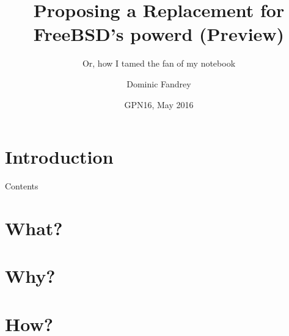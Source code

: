 \documentclass{beamer}
\title{Proposing a Replacement for FreeBSD's powerd (Preview)}
\subtitle{Or, how I tamed the fan of my notebook}
\author[D. Fandrey]{Dominic Fandrey}
\institute[VLI]{Von Leitner-Institut für verteiltes Echtzeit-Java}
\date[GPN 2016]{GPN16, May 2016}
\begin{document}
\section{Introduction}

\begin{frame}[plain]
\titlepage
\end{frame}

\begin{frame}{Contents}
\tableofcontents
\end{frame}

\section{What?}
\section{Why?}
\section{How?}
\end{document}
